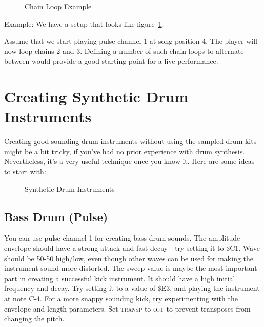 \begin{figure}[htpb]
	\begin{center}
	\end{center}
	\caption{Chain Loop Example}
	\label{fig:chainloop}
\end{figure}

Example: We have a setup that looks like figure~\ref{fig:chainloop}.

Assume that we start playing pulse channel 1 at song position 4. The player will now loop chains 2 and 3. Defining a number of such chain loops to alternate between would provide a good starting point for a live performance.

\section{Creating Synthetic Drum Instruments}

Creating good-sounding drum instruments without using the sampled drum kits might be a bit tricky, if you've had no prior experience with drum synthesis. Nevertheless, it's a very useful technique once you know it. Here are some ideas to start with:

\begin{figure}[hbtp]
	\centering
	\qquad

	\qquad

	\qquad

	\caption{Synthetic Drum Instruments}
	\label{fig:instr-examples}
\end{figure}

\subsection{Bass Drum (Pulse)}

You can use pulse channel 1 for creating bass drum sounds. The amplitude envelope should have a strong attack and fast decay - try setting it to \$C1. Wave should be 50-50 high/low, even though other waves can be used for making the instrument sound more distorted. The sweep value is maybe the most important part in creating a successful kick instrument. It should have a high initial frequency and decay. Try setting it to a value of \$E3, and playing the instrument at note C-4. For a more snappy sounding kick, try experimenting with the envelope and length parameters. Set \textsc{transp} to \textsc{off} to prevent transposes from changing the pitch.

